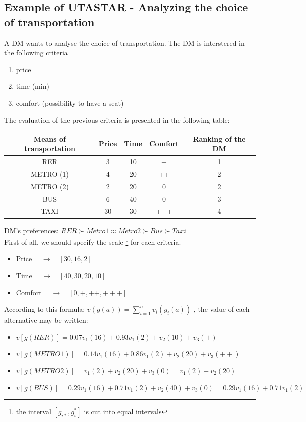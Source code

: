 \documentclass{report}
\begin{document}
\begin{appendices}
\chapter{Example of UTASTAR - Analyzing the choice of transportation}
A DM wants to analyse the choice of transportation. The DM is interstered in the following criteria 
\begin{enumerate}
\item price
\item time (min)
\item comfort (possibility to have a seat)
\end{enumerate}\leavevmode
The evaluation of the previous criteria is presented in the following table: 
\begin{center}
\begin{tabular}{ |c|c|c|c|c| } 
\hline
Means of transportation & Price & Time & Comfort & Ranking of the DM \\
\hline
RER & 3 & 10 & + & 1 \\
METRO (1) & 4 & 20 & ++ & 2 \\
METRO (2) & 2 & 20 & 0 & 2 \\
BUS & 6 & 40 & 0 & 3 \\
TAXI & 30 & 30 & +++ & 4 \\
\hline
\end{tabular}
\end{center}
DM's preferences: $ RER \succ  Metro1 \approx Metro2  \succ  Bus \succ  Taxi$\\
\newpage
First of all, we should specify the scale \footnote{the interval $[g_{i*}, g_{i}^{*}]$ is cut into equal intervals} for each criteria.
\begin{itemize}
\item Price  $\quad \rightarrow \quad [30, 16, 2]$
\item Time  $\quad \rightarrow \quad [40, 30, 20, 10]$
\item Comfort  $\quad \rightarrow \quad [0, +, ++, +++]$
\end{itemize}
According to this formula: $v(g(a)) = \sum_{i=1}^{n} v_i (g_i (a))$ , the value of each alternative may be written: 
\begin{itemize}
\item $v[g(RER)]= 0.07  v_1 (16) + 0.93 v_1(2) + v_2(10) + v_3(+)$
\item $v[g(METRO1)]= 0.14 v_1 (16) + 0.86 v_1(2) + v_2(20) + v_3(++)$
\item $v[g(METRO2)]= v_1 (2) + v_2(20) + v_3(0) =  v_1 (2) + v_2(20) $
\item $v[g(BUS)]= 0.29  v_1 (16) + 0.71 v_1(2) + v_2(40) + v_3(0) = 0.29 v_1 (16) + 0.71 v_1(2)$

\end{itemize}
\end{appendices}
\end{document}
